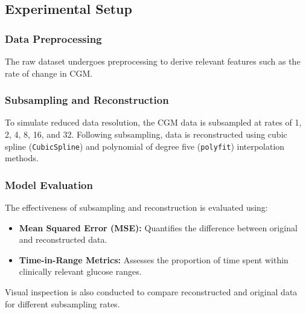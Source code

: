 \subsection{Experimental Setup}


\subsubsection{Data Preprocessing}
The raw dataset undergoes preprocessing to derive relevant features such as the rate of change in CGM.

\subsubsection{Subsampling and Reconstruction}
To simulate reduced data resolution, the CGM data is subsampled at rates of 1, 2, 4, 8, 16, and 32. Following subsampling, data is reconstructed using cubic spline (\texttt{CubicSpline}) and polynomial of degree five (\texttt{polyfit}) interpolation methods. 


\subsubsection{Model Evaluation}
The effectiveness of subsampling and reconstruction is evaluated using:
\begin{itemize}
	\item \textbf{Mean Squared Error (MSE):} Quantifies the difference between original and reconstructed data.
	\item \textbf{Time-in-Range Metrics:} Assesses the proportion of time spent within clinically relevant glucose ranges.
\end{itemize}
Visual inspection is also conducted to compare reconstructed and original data for different subsampling rates.



















